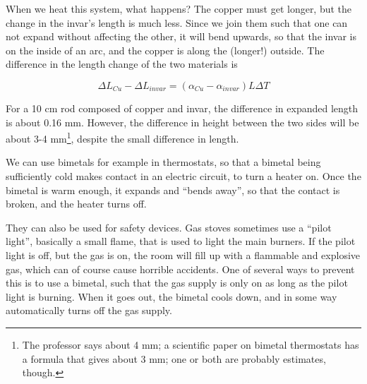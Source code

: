 \begin{figure}[H]
  \centering
{}
\end{figure}



When we heat this system, what happens? The copper must get longer, but the change in the invar's length is much less. Since we join them such that one can not expand without affecting the other, it will bend upwards, so that the invar is on the inside of an arc, and the copper is along the (longer!) outside. The difference in the length change of the two materials is

\begin{equation}
\Delta L_{Cu} - \Delta L_{invar} = (\alpha_{Cu} - \alpha_{invar}) L \Delta T
\end{equation}

For a 10 cm rod composed of copper and invar, the difference in expanded length is about 0.16 mm. However, the difference in height between the two sides will be about 3-4 mm\footnote{The professor says about 4 mm; a scientific paper on bimetal thermostats has a formula that gives about 3 mm; one or both are probably estimates, though.}, despite the small difference in length.

We can use bimetals for example in thermostats, so that a bimetal being sufficiently cold makes contact in an electric circuit, to turn a heater on. Once the bimetal is warm enough, it expands and ``bends away'', so that the contact is broken, and the heater turns off.

They can also be used for safety devices. Gas stoves sometimes use a ``pilot light'', basically a small flame, that is used to light the main burners. If the pilot light is off, but the gas is on, the room will fill up with a flammable and explosive gas, which can of course cause horrible accidents. One of several ways to prevent this is to use a bimetal, such that the gas supply is only on as long as the pilot light is burning. When it goes out, the bimetal cools down, and in some way automatically turns off the gas supply.

